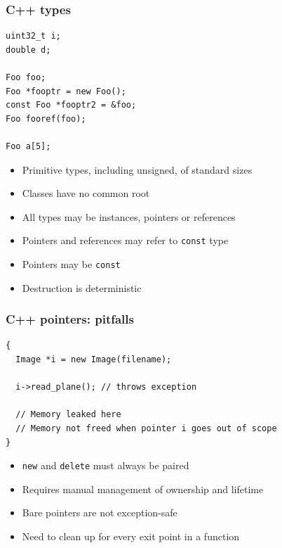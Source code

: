 \documentclass{beamer}
\begin{document}
\begin{frame}[fragile]
  \frametitle{C++ types}
  \begin{lstlisting}
uint32_t i;
double d;

Foo foo;
Foo *fooptr = new Foo();
const Foo *fooptr2 = &foo;
Foo fooref(foo);

Foo a[5];
\end{lstlisting}
  \begin{itemize}
  \item Primitive types, including unsigned, of standard sizes
  \item Classes have no common root
  \item All types may be instances, pointers or references
  \item Pointers and references may refer to \texttt{const} type
  \item Pointers may be \texttt{const}
  \item Destruction is deterministic
  \end{itemize}
\end{frame}

\begin{frame}[fragile]
  \frametitle{C++ pointers: pitfalls}
  \begin{lstlisting}
{
  Image *i = new Image(filename);

  i->read_plane(); // throws exception

  // Memory leaked here
  // Memory not freed when pointer i goes out of scope
}
\end{lstlisting}
  \begin{itemize}
    \item \texttt{new} and \texttt{delete} must always be paired
    \item Requires manual management of ownership and lifetime
    \item Bare pointers are not exception-safe
    \item Need to clean up for every exit point in a function
  \end{itemize}
\end{frame}
\end{document}
